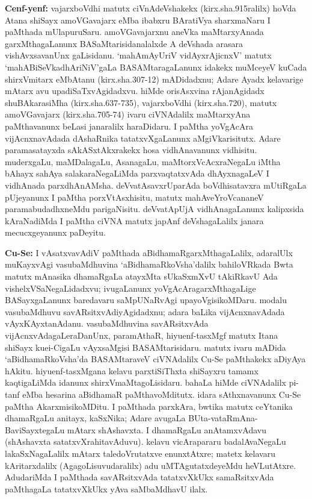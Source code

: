 {\bf Cenf-yenf:} vajarxboVdhi matutx ciVnAdeVshakekx (kirx.sha.915ralilx) hoVda Atana shiSayx amoVGavajarx eMba ibabxru BAratiVya sharxmaNaru I paMthada mUlapuruSaru. amoVGavajarxnu aneVka maMtarxyAnada garxMthagaLanunx BASaMtarisidanalalxde A deVshada arasara vishAvxsavanUnx gaLisidanu. `mahAmAyUriV vidAyxrAjicnxV' matutx `mahABiSeVkadhAriNiV'gaLa BASAMtaragaLanunx idakekx muMceyeV kuCada shirxVmitarx eMbAtanu (kirx.sha.307-12) mADidadxnu; Adare Ayadx kelavarige mAtarx avu upadiSaTxvAgidadxvu. hiMde orisAsxvina rAjanAgidadx shuBAkarasiMha (kirx.sha.637-735), vajarxboVdhi (kirx.sha.720), matutx amoVGavajarx (kirx.sha.705-74) ivaru ciVNAdalilx maMtarxyAna paMthavanunx beLasi janaralilx haraDidaru. I paMtha yoVgAcAra vijAcnxnavAdada dAshaRnika tatatxvXgaLanunx aMgiVkarisitutx. Adare paramasatayxda sAkASxtAkxrakekx hosa vidhAnavanunx vidhisitu. muderxgaLu, maMDalagaLu, AsanagaLu, maMtorxVcAcxraNegaLu iMtha bAhayx sahAya salakaraNegaLiMda parxvaqtatxvAda dhAyxnagaLeV I vidhAnada parxdhAnAMsha. deVvatAsavxrUparAda boVdhisatavxra mUtiRgaLa pUjeyanunx I paMtha porxVtAsxhisitu, matutx mahAveYroVcananeV paramabudadhxneMdu parigaNisitu. deVvatApUjA vidhAnagaLanunx kalipxsida kAraNadiMda I paMtha ciVNA matutx japAnf deVshagaLalilx janara mecucxgeyanunx paDeyitu.

{\bf Cu-Se:} I vAsatxvavAdiV paMthada aBidhamaRgarxMthagaLalilx, adaralUlx muKayx\-vAgi vasubaMdhuvina `aBidhamaRkoVsha'dalilx bahiloVRkada Bwta matutx mAnasika dhamaRgaLa atayxMta sUkaSxmXvU tAkiRkavU Ada vishelxVSaNegaLidadxvu; ivugaLanunx yoVgA\-cAragarxMthagaLige BASayxgaLanunx baredavaru saMpUNaRvAgi upayoVgisikoMDaru. modalu vasubaMdhuvu savARsitxvAdiyAgidadxnu; adara baLika vijAcnxnavAdada vAyxKAyxtanAdanu. vasubaMdhuvina savARsitxvAda vijAcnxvAdagaLeraDanUnx, paramAthaR, hiyuenf-tasxMgf matutx Itana shiSayx kuei-CigaLu vAyxsaMgisi BASAMtarisidaru. matutx ivaru mADida `aBidhamaRkoVsha'da BASAMtaraveV ciVNAdalilx Cu-Se paMthakekx aDiyAya hAkitu. hiyuenf-tasxMgana kelavu parxtiSiThxta shiSayxru tamamx kaqtigaLiMda idanunx shirxVmaMtagoLisidaru. bahaLa hiMde ciVNAdalilx pi-tanf eMba hesarina aBidhamaR paMthavoMditutx. idara sAthxnavanunx Cu-Se paMtha AkarxmisikoMDitu. I paMthada parxkAra, bwtika matutx ceYtanika dhamaRgaLu anitayx, kaSxNika; Adare avugaLa BUta-vataRmAna-BaviSayxtegaLu mAtarx shAshavxta. I dhamaRgaLu anAtamxvAdavu (shAshavxta satatxvXrahitavAduvu). kelavu vicArapararu badalAvaNegaLu lakaSxNagaLalilx mAtarx taledoVrutatxve enunxtAtxre; matetx kelavaru kAritarxdalilx (AgagoLisuvudaralilx) adu uMTAgutatxdeyeMdu heVLutAtxre. AdudariMda I paMthada savARsitxvAda tatatxvXkUkx samaRsitxvAda paMthagaLa tatatxvXkUkx yAva saMbaMdhavU ilalx.


